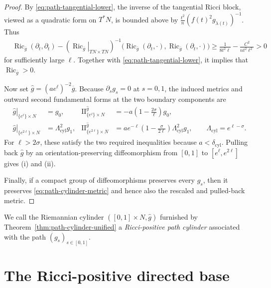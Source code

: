 \documentclass[11pt,reqno]{amsart}
\theoremstyle{definition}
\numberwithin{equation}{section}
\DeclareMathOperator{\Ric}{Ric}
\DeclareMathOperator{\II}{II}
\begin{document}
\begin{proof}
By \eqref{eq:path-tangential-lower}, the inverse of the tangential Ricci
block, viewed as a quadratic form on $T^*N$, is bounded above by
 $\frac{t^2}{n}(f(t)^2g_{\lambda(t)})^{-1}$.  Thus
\begin{align}
 &\Ric_{\overline g}(\partial_t,\partial_t)
 -\left(\left.\Ric_{\overline g}\right|_{TN\times TN}\right)^{-1}
  \bigl(\Ric_{\overline g}(\partial_t,\mathord\cdot),
        \Ric_{\overline g}(\partial_t,\mathord\cdot)\bigr)\ge
 \frac1{8t^2\ell}-\frac{C^2}{nt^2\ell^2}>0
 \label{eq:path-schur-complement}
\end{align}
for sufficiently large $\ell$.  Together with
\eqref{eq:path-tangential-lower}, it implies that
$\Ric_{\overline g}>0$.

Now set $\widehat g=(ae^\ell)^{-2}\overline g$.  Because
$\partial_sg_s=0$ at $s=0,1$, the induced metrics and outward second
fundamental forms at the two boundary components are
\begin{align*}
 \left.\widehat g\right|_{\{e^\ell\}\times N}
 &=g_0,&
 \II^{\widehat g}_{\{e^\ell\}\times N}
 &=-a\left(1-\frac{2\sigma}{\ell}\right)g_0,\\
 \left.\widehat g\right|_{\{e^{2\ell}\}\times N}
 &=\Lambda_{\mathrm{cyl}}^2g_1,&
 \II^{\widehat g}_{\{e^{2\ell}\}\times N}
 &=ae^{-\ell}\left(1-\frac{\sigma}{2\ell}\right)
       \Lambda_{\mathrm{cyl}}^2g_1,
 \qquad \Lambda_{\mathrm{cyl}}=e^{\ell-\sigma}.
\end{align*}
For $\ell>2\sigma$, these satisfy the two required inequalities because
$a<\delta_{\mathrm{cyl}}$.  Pulling back $\widehat g$ by an
orientation-preserving diffeomorphism from $[0,1]$ to
$[e^\ell,e^{2\ell}]$ gives \textup{(i)} and \textup{(ii)}.

Finally, if a compact group of diffeomorphisms preserves every $g_s$,
then it preserves \eqref{eq:path-cylinder-metric} and hence also the
rescaled and pulled-back metric.
\end{proof}

We call the Riemannian cylinder $([0,1]\times N,\widehat g)$ furnished
by Theorem~\ref{thm:path-cylinder-unified} a \emph{Ricci-positive path
cylinder} associated with the path $(g_s)_{s\in[0,1]}$.



\section{The Ricci-positive directed base}
\label{sec:unified-directed-base}
\end{document}
